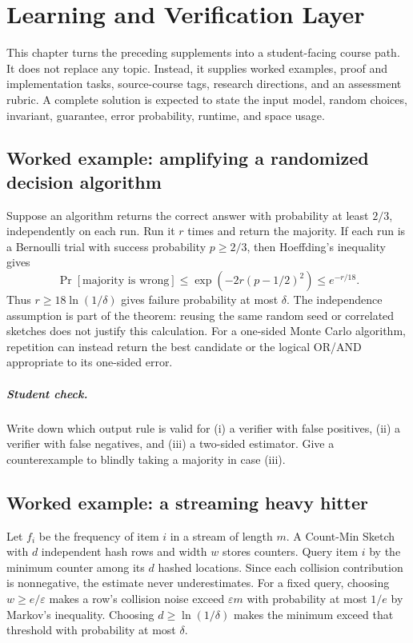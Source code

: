 \chapter{Learning and Verification Layer}
\label{ch:stage8-learning-verification}

This chapter turns the preceding supplements into a student-facing course
path.  It does not replace any topic.  Instead, it supplies worked examples,
proof and implementation tasks, source-course tags, research directions, and
an assessment rubric.  A complete solution is expected to state the input
model, random choices, invariant, guarantee, error probability, runtime, and
space usage.

\section{Worked example: amplifying a randomized decision algorithm}

Suppose an algorithm returns the correct answer with probability at least
$2/3$, independently on each run.  Run it $r$ times and return the majority.
If each run is a Bernoulli trial with success probability $p\geq2/3$, then
Hoeffding's inequality gives
\[
 \Pr[\text{majority is wrong}]
 \leq \exp\left(-2r(p-1/2)^2\right)\leq e^{-r/18}.
\]
Thus $r\geq18\ln(1/\delta)$ gives failure probability at most $\delta$.
The independence assumption is part of the theorem: reusing the same random
seed or correlated sketches does not justify this calculation.  For a
one-sided Monte Carlo algorithm, repetition can instead return the best
candidate or the logical OR/AND appropriate to its one-sided error.

\paragraph{Student check.}
Write down which output rule is valid for (i) a verifier with false positives,
(ii) a verifier with false negatives, and (iii) a two-sided estimator.  Give a
counterexample to blindly taking a majority in case (iii).

\section{Worked example: a streaming heavy hitter}

Let $f_i$ be the frequency of item $i$ in a stream of length $m$.  A Count-Min
Sketch with $d$ independent hash rows and width $w$ stores counters.  Query
item $i$ by the minimum counter among its $d$ hashed locations.  Since each
collision contribution is nonnegative, the estimate never underestimates.
For a fixed query, choosing $w\geq e/\varepsilon$ makes a row's collision
noise exceed $\varepsilon m$ with probability at most $1/e$ by Markov's
inequality.  Choosing $d\geq\ln(1/\delta)$ makes the minimum exceed that
threshold with probability at most $\delta$.

